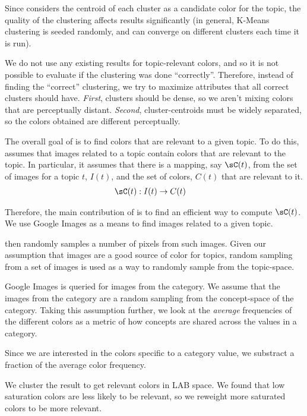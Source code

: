 Since \system considers the centroid of each cluster as a candidate color for the topic, the quality of the clustering affects results significantly (in general, K-Means clustering is seeded randomly, and can converge on different clusters each time it is run).

We do not use any existing results for topic-relevant colors, and so it is not possible to evaluate if the clustering was done ``correctly''. Therefore, instead of finding the ``correct'' clustering, we try to maximize attributes that all correct clusters should have. {\em First}, clusters should be dense, so we aren't mixing colors that are perceptually distant. {\em Second}, cluster-centroids must be widely separated, so the colors obtained are different perceptually.


The overall goal of \system is to find colors that are relevant to a given topic. To do this, \system assumes that images related to a topic contain colors that are relevant to the topic. In particular, it assumes that there is a mapping, say $\sC(t)$, from the set of images for a topic $t$, $I(t)$, and the set of colors, $C(t)$ that are relevant to it. 
\begin{align*}
\sC(t) : I(t) &\rightarrow C(t)
\end{align*} 

Therefore, the main contribution of \system is to find an efficient way to compute $\sC(t)$. 
We use Google Images as a means to find images related to a given topic. 

\system then randomly samples a number of pixels from such images. Given our assumption that images are a good source of color for topics, random sampling from a set of images is used as a way to randomly sample from the topic-space.   

Google Images is queried for images from  the category.
We assume that the images from the category are a random sampling from the concept-space of the category. Taking this assumption further, we look at the {\em average} frequencies of the different colors as a metric of how concepts are shared across the values in a category.



Since we are interested in the colors specific to a category value, we substract a fraction of the average color frequency. 

We cluster the result to get relevant colors in LAB space. We found that low saturation colors are less likely to be relevant, 
so we reweight more saturated colors to be more relevant.
